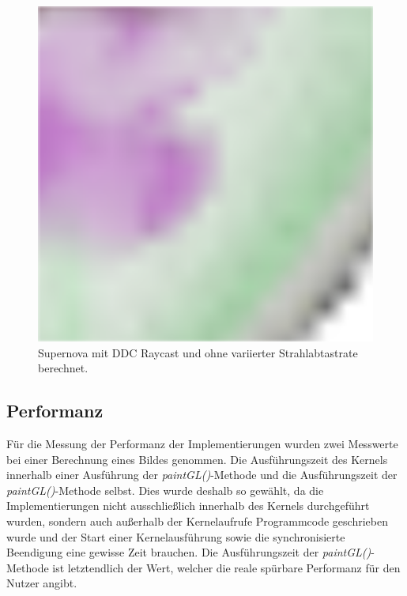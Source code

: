 \begin{figure}[]
\begin{minipage}[t]{0.3\textwidth}
	\end{minipage}
	\hfill
	\begin{minipage}[t]{0.3\textwidth}
		\centering
		\includegraphics[width=1\textwidth]{../../Neue_Messungen/Supernova/cut/ddc_ors/ddc_ors_3.png}
	\end{minipage}
	\caption{Supernova mit DDC Raycast und ohne variierter Strahlabtastrate berechnet.}
	\label{fig::res::sn_comp_ddc_ors}
\end{figure}

\clearpage

\subsection{Performanz}
Für die Messung der Performanz der Implementierungen wurden zwei Messwerte bei einer Berechnung eines Bildes genommen.
Die Ausführungszeit des Kernels innerhalb einer Ausführung der \emph{paintGL()}-Methode und die Ausführungszeit der \emph{paintGL()}-Methode selbst.
Dies wurde deshalb so gewählt, da die Implementierungen nicht ausschließlich innerhalb des Kernels durchgeführt wurden, sondern auch außerhalb der Kernelaufrufe Programmcode geschrieben wurde und der Start einer Kernelausführung sowie die synchronisierte Beendigung eine gewisse Zeit brauchen.
Die Ausführungszeit der \emph{paintGL()}-Methode ist letztendlich der Wert, welcher die reale spürbare Performanz für den Nutzer angibt.

